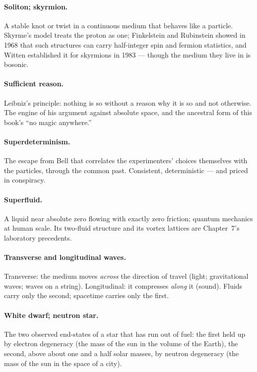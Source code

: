 \documentclass[fontsize=11pt,paper=a4,pagesize=auto,parskip=half-]{scrbook}
\begin{document}
\paragraph{Soliton; skyrmion.} A stable knot or twist in a continuous medium that behaves like a particle. Skyrme's model treats the proton as one; Finkelstein and Rubinstein showed in 1968 that such structures can carry half-integer spin and fermion statistics, and Witten established it for skyrmions in 1983 --- though the medium they live in is bosonic.

\paragraph{Sufficient reason.} Leibniz's principle: nothing is so without a reason why it is so and not otherwise. The engine of his argument against absolute space, and the ancestral form of this book's ``no magic anywhere.''

\paragraph{Superdeterminism.} The escape from Bell that correlates the experimenters' choices themselves with the particles, through the common past. Consistent, deterministic --- and priced in conspiracy.

\paragraph{Superfluid.} A liquid near absolute zero flowing with exactly zero friction; quantum mechanics at human scale. Its two-fluid structure and its vortex lattices are Chapter~7's laboratory precedents.

\paragraph{Transverse and longitudinal waves.} Transverse: the medium moves \emph{across} the direction of travel (light; gravitational waves; waves on a string). Longitudinal: it compresses \emph{along} it (sound). Fluids carry only the second; spacetime carries only the first.

\paragraph{White dwarf; neutron star.} The two observed end-states of a star that has run out of fuel: the first held up by electron degeneracy (the mass of the sun in the volume of the Earth), the second, above about one and a half solar masses, by neutron degeneracy (the mass of the sun in the space of a city).
\end{document}
